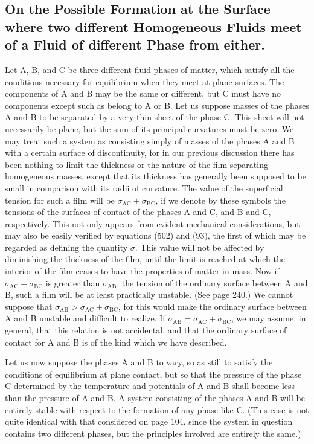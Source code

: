 \documentclass[12pt]{memoir}
\begin{document}
{\subsection{On the Possible Formation at the Surface where two different Homogeneous Fluids meet of a Fluid of different Phase from either.}
Let A, B, and C be three different fluid phases of matter, which satisfy all the conditions necessary for equilibrium when they meet at plane surfaces. The components of A and B may be the same or different, but C must have no components except such as belong to A or B. Let us suppose masses of the phases A and B to be separated by a very thin sheet of the phase C. This sheet will not necessarily be plane, but the sum of its principal curvatures must be zero. We may treat such a system as consisting simply of masses of the phases A and B with a certain surface of discontinuity, for in our previous discussion there has been nothing to limit the thickness or the nature of the film separating homogeneous masses, except that its thickness has generally been supposed to be small in comparison with its radii of curvature.  The value of the superficial tension for such a film will be $\sigma_{\text{AC}} + \sigma_{\text{BC}}$, if we denote by these symbols the tensions of the surfaces of contact of the phases A and C, and B and C, respectively. This not only appears from evident mechanical considerations, but may also be easily verified by equations (502) and (93), the first of which may be regarded as defining the quantity $\sigma$. This value will not be affected by diminishing the thickness of the film, until the limit is reached at which the interior of the film ceases to have the properties of matter in mass. Now if $\sigma_{\text{AC}} + \sigma_{\text{BC}}$ is greater than $\sigma_{\text{AB}}$, the tension of the ordinary surface between A and B, such a film will be at least practically unstable.  (See page 240.)  We cannot suppose that $\sigma_{\text{AB}} > \sigma_{\text{AC}}+ \sigma_{\text{BC}}$, for this would make the ordinary surface between A and B unstable and difficult to realize. If $\sigma_{\text{AB}} = \sigma_{\text{AC}}+ \sigma_{\text{BC}}$, we may assume, in general, that this relation is not accidental, and that the ordinary surface of contact for A and B is of the kind which we have described.

Let us now suppose the phases A and B to vary, so as still to satisfy the conditions of equilibrium at plane contact, but so that the pressure of the phase C determined by the temperature and potentials of A and B shall become less than the pressure of A and B. A system consisting of the phases A and B will be entirely stable with respect to the formation of any phase like C. (This case is not quite identical with that considered on page 104, since the system in question contains two different phases, but the principles involved are entirely the same.)

}
\end{document}
